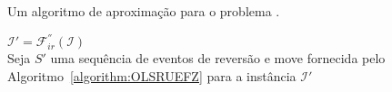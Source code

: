 \begin{algorithm}[!tbh]
  \caption{Um algoritmo de aproximação para o problema \SbFIRM{}.\label{algorithm:DYDJWEUH}}
  $\mathcal{I}' = \mathcal{F}_{ir}^{''}(\mathcal{I})$ \\
  Seja $S'$ uma sequência de eventos de reversão e move fornecida pelo Algoritmo~\ref{algorithm:OLSRUEFZ} para a instância $\mathcal{I}'$ \\
\end{algorithm}
